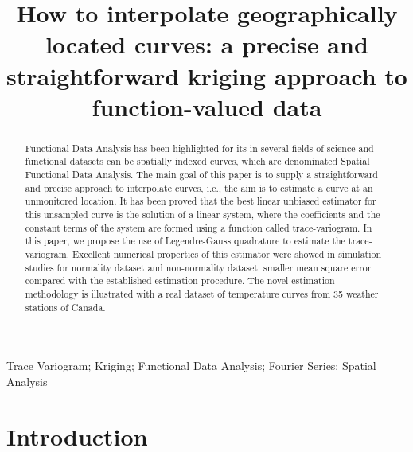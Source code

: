 \documentclass[12pt]{interact}
\theoremstyle{plain}%
\theoremstyle{definition}
\theoremstyle{remark}
\begin{document}

\title{How to interpolate geographically located curves: a precise and straightforward kriging approach to function-valued data}

\author{
}

\maketitle

\begin{abstract}
Functional Data Analysis has been highlighted for its in several fields of science and functional datasets can be spatially indexed curves, which are denominated Spatial Functional Data Analysis. The main goal of this paper is to supply a straightforward and precise approach to interpolate curves, i.e., the aim is to estimate a curve at an unmonitored location. It has been proved that the best linear unbiased estimator for this unsampled curve is the solution of a linear system, where the coefficients and the constant terms of the system are formed using a function called trace-variogram. In this paper, we propose the use of Legendre-Gauss quadrature to estimate the trace-variogram. Excellent numerical properties of this estimator were showed in simulation studies for normality dataset and non-normality dataset: smaller mean square error compared with the established estimation procedure. The novel estimation methodology is illustrated with a real dataset of temperature curves from 35 weather stations of Canada.
\end{abstract}

\begin{keywords}
Trace Variogram; Kriging; Functional Data Analysis; Fourier Series; Spatial Analysis
\end{keywords}


\section{Introduction}\label{introduction}
\end{document}
